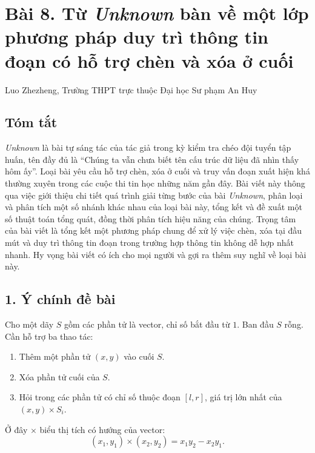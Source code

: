 \documentclass[11pt]{article}
\begin{document}
\section*{Bài 8. Từ \emph{Unknown} bàn về một lớp phương pháp duy trì thông tin đoạn có hỗ trợ chèn và xóa ở cuối}

\begin{center}
Luo Zhezheng, Trường THPT trực thuộc Đại học Sư phạm An Huy
\end{center}

\subsection*{Tóm tắt}

\emph{Unknown} là bài tự sáng tác của tác giả trong kỳ kiểm tra chéo đội tuyển
tập huấn, tên đầy đủ là ``Chúng ta vẫn chưa biết tên cấu trúc dữ liệu đã nhìn
thấy hôm ấy''. Loại bài yêu cầu hỗ trợ chèn, xóa ở cuối và truy vấn đoạn xuất
hiện khá thường xuyên trong các cuộc thi tin học những năm gần đây. Bài viết
này thông qua việc giới thiệu chi tiết quá trình giải từng bước của bài
\emph{Unknown}, phân loại và phân tích một số nhánh khác nhau của loại bài
này, tổng kết và đề xuất một số thuật toán tổng quát, đồng thời phân tích
hiệu năng của chúng. Trọng tâm của bài viết là tổng kết một phương pháp chung
để xử lý việc chèn, xóa tại đầu mút và duy trì thông tin đoạn trong trường hợp
thông tin không dễ hợp nhất nhanh. Hy vọng bài viết có ích cho mọi người và
gợi ra thêm suy nghĩ về loại bài này.

\subsection*{1. Ý chính đề bài}

Cho một dãy \(S\) gồm các phần tử là vector, chỉ số bắt đầu từ \(1\). Ban đầu
\(S\) rỗng. Cần hỗ trợ ba thao tác:
\begin{enumerate}
  \item Thêm một phần tử \((x,y)\) vào cuối \(S\).
  \item Xóa phần tử cuối của \(S\).
  \item Hỏi trong các phần tử có chỉ số thuộc đoạn \([l,r]\), giá trị lớn nhất
  của \((x,y)\times S_i\).
\end{enumerate}
Ở đây \(\times\) biểu thị tích có hướng của vector:
\[
  (x_1,y_1)\times(x_2,y_2)=x_1y_2-x_2y_1.
\]
\end{document}
